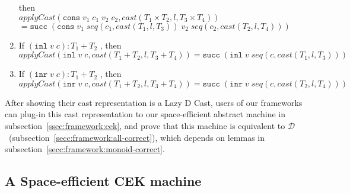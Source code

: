 \documentclass[acmsmall,review,anonymous]{acmart}\settopmatter{printfolios=true,printccs=false,printacmref=false}
\newcommand{\plus}[0]{+}
\newcommand{\POOprod}[2]{#1 \times #2}
\newcommand{\POOsum}[2]{#1 \plus #2}
\newcommand{\rOOsucc}[1]{\mathtt{succ}\;#1}
\newcommand{\hcvOOcons}[4]{\mathtt{cons}\;#1\;#2\;#3\;#4}
\newcommand{\hcvOOinl}[2]{\mathtt{inl}\;#1\;#2}
\newcommand{\hcvOOinr}[2]{\mathtt{inr}\;#1\;#2}
\newcommand{\ineffCEKD}{$ \mathcal{D} $}
\begin{document}
\begin{definition}
\begin{enumerate}
		then \\
		$ 
		applyCast(\hcvOOcons{v_1}{c_1}{v_2}{c_2},cast(\POOprod{T_1}{T_2},l,T_3 
		\times 
		T_4)) $ \\
		$ = 
		\rOOsucc{(\hcvOOcons{v_1}{seq(c_1,cast(T_1,l,T_3))}{v_2}{seq(c_2,cast(T_2,l,T_4))})}
		$ 
		\item If $ (\hcvOOinl{v}{c}) : \POOsum{T_1}{T_2} $ ,
		then \\
		$ 
		applyCast(\hcvOOinl{v}{c},cast(\POOsum{T_1}{T_2},l,\POOsum{T_3}{T_4}))
		= \rOOsucc{(\hcvOOinl{v}{seq(c,cast(T_1,l,T_3))})} $
		\item If $ (\hcvOOinr{v}{c}) : \POOsum{T_1}{T_2} $ ,
		then \\ $ 
		applyCast(\hcvOOinr{v}{c},cast(\POOsum{T_1}{T_2},l,\POOsum{T_3}{T_4}))
		= \rOOsucc{(\hcvOOinr{v}{seq(c,cast(T_2,l,T_4))})} $
	\end{enumerate}
\end{definition}


After showing their cast representation is a Lazy D Cast, users of our 
frameworks can plug-in this cast representation to our space-efficient abstract 
machine in subsection~\ref{ssec:framework:cek}, and prove that this machine is 
equivalent to \ineffCEKD\ (subsection~\ref{secc:framework:all-correct}), which 
depends on lemmas in subsection~\ref{secc:framework:monoid-correct}.

\subsection{A Space-efficient CEK machine}
\label{sec:framework:cek}
\end{document}

